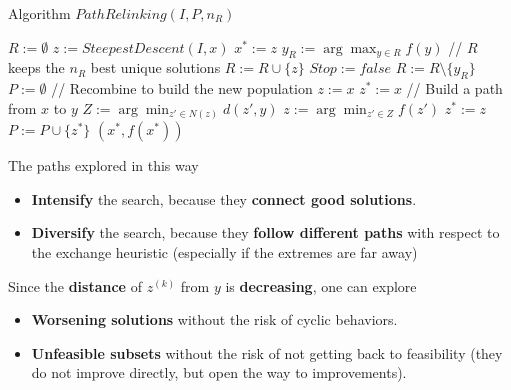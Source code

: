 \newpage

\begin{algorithm}[H]
	\caption{Algorithm $PathRelinking(I , P, n_R )$}
	\begin{algorithmic}
		\REPEAT
		\STATE $R := \emptyset$
		\STATE $z := SteepestDescent(I , x)$
		\STATE $x^\ast := z$
		\ENDIF
		\STATE $y_R := \arg \max_{y\in R} f (y )$
		\STATE // $R$ keeps the $n_R$ best unique solutions
		\STATE $R := R \cup \{z\}$ 
		\STATE $Stop := false$
		\STATE $R := R \setminus \{y_R \}$
		\ENDIF
		\ENDIF
		\ENDFOR
		\STATE $P := \emptyset$
		\STATE // Recombine to build the new population
		\STATE $z := x$
		\STATE $z^\ast := x$
		\STATE // Build a path from $x$ to $y$
		\STATE $Z := \arg \min_{z' \in N(z)} d (z', y )$
		\STATE $z := \arg \min_{z' \in Z} f (z')$
		\STATE $z^\ast := z$
		\ENDIF
		\ENDWHILE
		\STATE $P := P \cup \{z^\ast\}$
		\ENDIF
		\ENDFOR
		\RETURN $(x^\ast, f (x^\ast))$
	\end{algorithmic}
\end{algorithm}

\newpage

The paths explored in this way
\begin{itemize}
	\item \textbf{Intensify} the search, because they \textbf{connect good solutions}.\\
	
	\item \textbf{Diversify} the search, because they \textbf{follow different paths} with respect to the exchange heuristic (especially if the extremes are far away)
\end{itemize}

Since the \textbf{distance} of $z^{(k)}$ from $y$ is \textbf{decreasing}, one can explore 
\begin{itemize}
	\item \textbf{Worsening solutions} without the risk of cyclic behaviors.\\
	
	\item \textbf{Unfeasible subsets} without the risk of not getting back to feasibility (they do not improve directly, but open the way to improvements).\\
\end{itemize}

